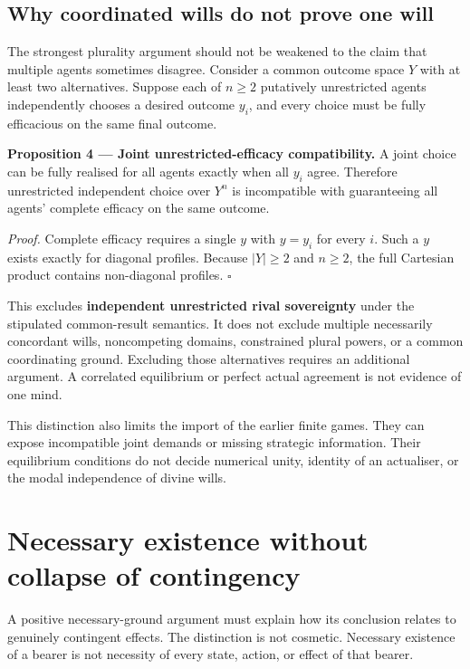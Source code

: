 \documentclass[11pt,a4paper]{article}
\begin{document}
\subsection{Why coordinated wills do not prove one
will}\label{why-coordinated-wills-do-not-prove-one-will}

The strongest plurality argument should not be weakened to the claim
that multiple agents sometimes disagree. Consider a common outcome space
\(Y\) with at least two alternatives. Suppose each of \(n\ge2\)
putatively unrestricted agents independently chooses a desired outcome
\(y_i\), and every choice must be fully efficacious on the same final
outcome.


\textbf{Proposition 4 --- Joint unrestricted-efficacy compatibility.} A
joint choice can be fully realised for all agents exactly when all
\(y_i\) agree. Therefore unrestricted independent choice over \(Y^n\) is
incompatible with guaranteeing all agents' complete efficacy on the same
outcome.

\emph{Proof.} Complete efficacy requires a single \(y\) with \(y=y_i\)
for every \(i\). Such a \(y\) exists exactly for diagonal profiles.
Because \(|Y|\ge2\) and \(n\ge2\), the full Cartesian product contains
non-diagonal profiles. \(\square\)

This excludes \textbf{independent unrestricted rival sovereignty} under
the stipulated common-result semantics. It does not exclude multiple
necessarily concordant wills, noncompeting domains, constrained plural
powers, or a common coordinating ground. Excluding those alternatives
requires an additional argument. A correlated equilibrium or perfect
actual agreement is not evidence of one mind.

This distinction also limits the import of the earlier finite games.
They can expose incompatible joint demands or missing strategic
information. Their equilibrium conditions do not decide numerical unity,
identity of an actualiser, or the modal independence of divine wills.

\section{Necessary existence without collapse of
contingency}\label{necessary-existence-without-collapse-of-contingency}

A positive necessary-ground argument must explain how its conclusion
relates to genuinely contingent effects. The distinction is not
cosmetic. Necessary existence of a bearer is not necessity of every
state, action, or effect of that bearer.
\end{document}
